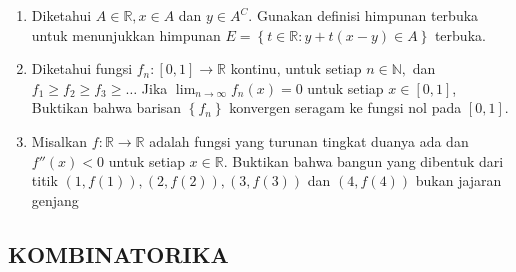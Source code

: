 \documentclass[12pt,twoside]{article}
\begin{document}
\begin{enumerate}
	\item Diketahui $A \in \mathbb{R}, x \in A$ dan $y \in A^{C}$. Gunakan definisi himpunan terbuka untuk menunjukkan himpunan $E = \left\lbrace t \in \mathbb{R} : y + t(x-y) \in A \right\rbrace$ terbuka.

	\item Diketahui fungsi $f_n : [0,1] \to \mathbb{R}$ kontinu, untuk setiap $n\in \mathbb{N},$ dan $f_1 \geq f_2 \geq f_3 \geq\dots $ Jika $\displaystyle \lim_{n \to \infty} f_n(x) = 0$ untuk setiap $x \in [0,1]$, Buktikan bahwa barisan $\left\lbrace f_n \right\rbrace$ konvergen seragam ke fungsi nol pada $[0,1]$.

	\item Misalkan $f : \mathbb{R} \to \mathbb{R} $ adalah fungsi yang turunan tingkat duanya ada dan $f''(x) < 0$ untuk setiap $x \in \mathbb{R}$. Buktikan bahwa bangun yang dibentuk dari titik $(1,f(1)),(2,f(2)),(3,f(3))$ dan $(4,f(4))$ bukan jajaran genjang
\end{enumerate}

\newpage
\subsection{KOMBINATORIKA}
\end{document}
